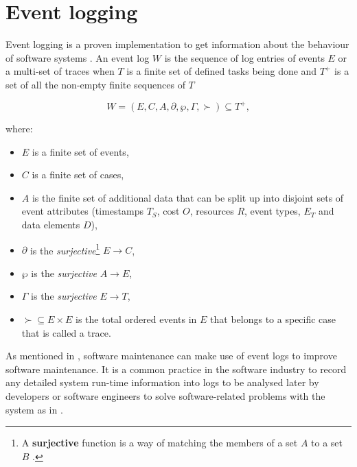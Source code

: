 \section{Event logging}\label{sec:ch1_eventLogging}
Event logging is a proven implementation to get information about the behaviour of software systems \cite{Baccanico2014}.
An event log $W$ is the sequence of log entries of events $E$ or a multi-set of traces when $T$ is a finite set of defined tasks being done and $T^+$ is a set of all the non-empty finite sequences of $T$ \cite{Kherbouche2017}

\begin{equation}
	\label{eq:LogEvent}
	W = (E, C, A, \partial, \wp, \Gamma, \succ) \subseteq T^+,
\end{equation}

where:

\begin{itemize}
	\item $E$ is a finite set of events,
	\item $C$ is a finite set of cases,
	\item $A$ is the finite set of additional data that can be split up into disjoint sets of event attributes (timestamps $T_S$, cost $O$, resources $R$, event types, $E_T$ and data elements $D$),
	\item $\partial$ is the \textit{surjective}\footnote{\label{ftn:Surjective}A \textbf{surjective} function is a way of matching the members of a set $A$ to a set $B$ \cite{Szendrei1990}.} $E\rightarrow C$,
	\item $\wp$ is the \textit{surjective} $A\rightarrow E$,
	\item $\Gamma$ is the \textit{surjective} $E\rightarrow T$,
	\item $\succ \subseteq E\times E$ is the total ordered events in $E$ that belongs to a specific case that is called a trace.
\end{itemize}

As mentioned in , software maintenance can make use of event logs to improve software maintenance. It is a common practice in the software industry to record any detailed system run-time information into logs to be analysed later by developers or software engineers to solve software-related problems with the system as in  \cite{Zhu2019}.

